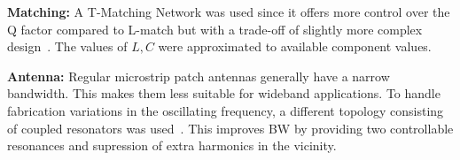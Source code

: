 
\textbf{Matching:}
A T-Matching Network was used since it offers more control over the Q factor compared to L-match but with a trade-off of slightly more complex design~\cite{Pozar:882338}. The values of \(L, C\) were approximated to available component values.\par

\textbf{Antenna:}
Regular microstrip patch antennas generally have a narrow bandwidth. This makes them less suitable for wideband applications. To handle fabrication variations in the oscillating frequency, a different topology consisting of coupled resonators was used~\cite{7592896}. This improves BW by providing two controllable resonances and supression of extra harmonics in the vicinity.\par


